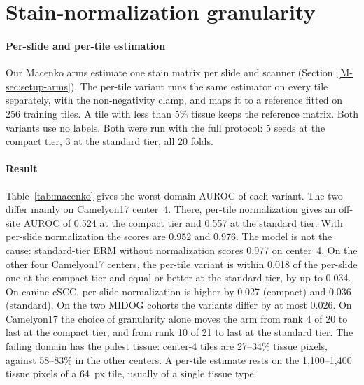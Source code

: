 \section{Stain-normalization granularity}
\label{app:macenko}

\paragraph{Per-slide and per-tile estimation} Our Macenko arms estimate one
stain matrix per slide and scanner (Section~\ref{M-sec:setup-arms}). The per-tile
variant runs the same estimator on every tile separately, with the
non-negativity clamp, and maps it to a reference fitted on 256 training tiles.
A tile with less than 5\% tissue keeps the reference matrix. Both variants use
no labels. Both were run with the full protocol: 5 seeds at the compact tier,
3 at the standard tier, all 20 folds.

\paragraph{Result} Table~\ref{tab:macenko} gives the worst-domain AUROC of each
variant. The two differ mainly on Camelyon17 center~4. There, per-tile
normalization gives an off-site AUROC of 0.524 at the compact tier and 0.557 at
the standard tier. With per-slide normalization the scores are 0.952 and 0.976.
The model is not the cause: standard-tier ERM without normalization scores 0.977
on center~4. On the other four Camelyon17 centers, the per-tile variant is
within 0.018 of the per-slide one at the compact tier and equal or better at
the standard tier, by up to 0.034. On canine cSCC, per-slide normalization is
higher by 0.027 (compact) and 0.036 (standard). On the two MIDOG cohorts the
variants differ by at most 0.026. On Camelyon17 the choice of granularity alone moves the arm from rank 4 of 20
to last at the compact tier, and from rank 10 of 21 to last at the standard
tier. The failing domain has the palest tissue: center-4 tiles are 27--34\% tissue pixels,
against 58--83\% in the other centers. A per-tile estimate rests on the
1,100--1,400 tissue pixels of a 64~px tile, usually of a single tissue type.

